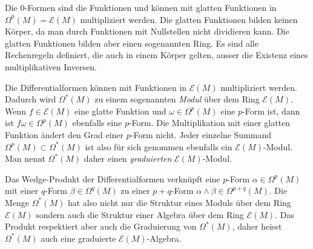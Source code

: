Die $0$-Formen sind die Funktionen und können mit glatten Funktionen in
$\Omega^0(M)=\mathscr{E}(M)$ multipliziert werden.
Die glatten Funktionen bilden keinen Körper, da man durch Funktionen mit
Nullstellen nicht dividieren kann.
Die glatten Funktionen bilden aber einen sogenannten Ring. 
%
Es sind alle Rechenregeln definiert, die auch in einem Körper gelten,
ausser die Existenz eines multiplikativen Inversen.

Die Differentialformen können mit Funktionen in $\mathscr{E}(M)$
multipliziert werden.
Dadurch wird $\Omega^*(M)$ zu einem sogenannten {\em Modul} über
dem Ring $\mathscr{E}(M)$.
Wenn $f\in\mathscr{E}(M)$ eine glatte Funktion und $\omega\in\Omega^p(M)$
eine $p$-Form ist, dann ist $f\omega\in\Omega^p(M)$ ebenfalls eine
$p$-Form.
Die Multiplikation mit einer glatten Funktion ändert den Grad einer
$p$-Form nicht.
Jeder einzelne Summand $\Omega^p(M)\subset\Omega^*(M)$ ist also für
sich genommen ebenfalls ein $\mathscr{E}(M)$-Modul.
Man nennt $\Omega^*(M)$ daher einen {\em graduierten} $\mathscr{E}(M)$-Modul.
%
%

Das Wedge-Produkt der Differentialformen verknüpft eine $p$-Form
$\alpha\in\Omega^p(M)$ mit einer $q$-Form $\beta\in\Omega^q(M)$
zu einer $p+q$-Form $\alpha\wedge\beta\in\Omega^{p+q}(M)$.
Die Menge $\Omega^*(M)$ hat also nicht nur die Struktur eines
Moduls über dem Ring $\mathscr{E}(M)$ sondern auch die Struktur
einer Algebra über dem Ring $\mathscr{E}(M)$.
Das Produkt respektiert aber auch die Graduierung von $\Omega^*(M)$,
daher heisst $\Omega^*(M)$ auch eine graduierte $\mathscr{E}(M)$-Algebra.

